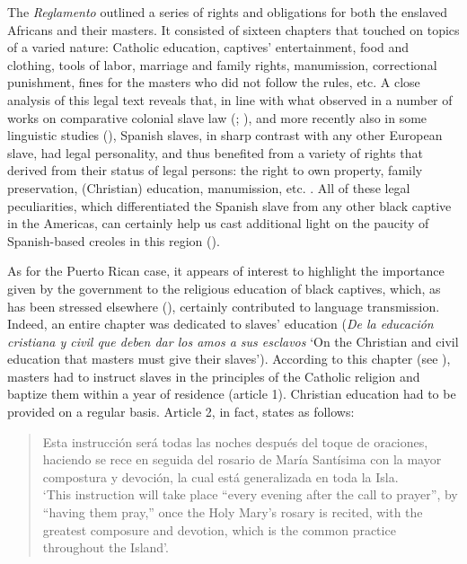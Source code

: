 \documentclass[output=paper,colorlinks,citecolor=brown]{langscibook}
\begin{document}
The \textit{Reglamento} outlined a series of rights and obligations for both the enslaved Africans and their masters. It consisted of sixteen chapters that touched on topics of a varied nature: Catholic education, captives’ entertainment, food and clothing, tools of labor, marriage and family rights, manumission, correctional punishment, fines for the masters who did not follow the rules, etc. A close analysis of this legal text reveals that, in line with what observed in a number of works on comparative colonial slave law (\citealt{Tannenbaum1946,Watson1989}; \citealt{delaFuente2004}), and more recently also in some linguistic studies (\citealt{Sessarego2015,Sessarego2017,Sessarego2019}), Spanish slaves, in sharp contrast with any other European slave, had legal personality, and thus benefited from a variety of rights that derived from their status of legal persons: the right to own property, family preservation, (Christian) education, manumission, etc. \citep{Sessarego2018_laschiavitu}. All of these legal peculiarities, which differentiated the Spanish slave from any other black captive in the Americas, can certainly help us cast additional light on the paucity of Spanish-based creoles in this region (\citealt{Sessarego2018_enhancing,Visconte_forthcoming}).

As for the Puerto Rican case, it appears of interest to highlight the importance given by the government to the religious education of black captives, which, as has been stressed elsewhere (\citealt{Sessarego2013_chotavalley,Sessarego2015,Sessarego2019}), certainly contributed to language transmission. Indeed, an entire chapter was dedicated to slaves’ education (\textit{De la educación cristiana y civil que deben dar los amos a sus esclavos} ‘On the Christian and civil education that masters must give their slaves’). According to this chapter (see \citealt{Zavala-Trías2003}), masters had to instruct slaves in the principles of the Catholic religion and baptize them within a year of residence (article 1). Christian education had to be provided on a regular basis. Article 2, in fact, states as follows:

\begin{quote}
Esta instrucción será todas las noches después del toque de oraciones, haciendo se rece en seguida del rosario de María Santísima con la mayor compostura y devoción, la cual está generalizada en toda la Isla.\\
`This instruction will take place “every evening after the call to prayer”, by “having them pray,” once the Holy Mary's rosary is recited, with the greatest composure and devotion, which is the common practice throughout the Island'.
\end{quote}
\end{document}
